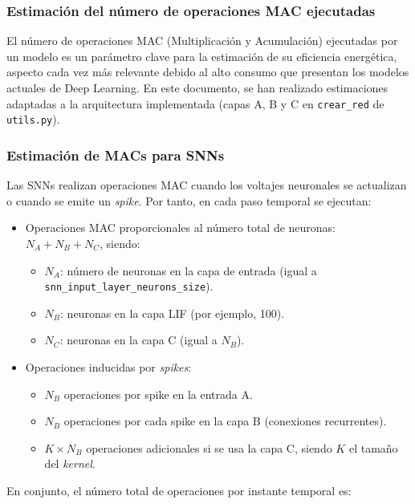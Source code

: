 \subsubsection{Estimación del número de operaciones MAC ejecutadas}

El número de operaciones MAC (Multiplicación y Acumulación) ejecutadas por un modelo es un parámetro clave para la estimación de su eficiencia energética, aspecto cada vez más relevante debido al alto consumo que presentan los modelos actuales de Deep Learning. En este documento, se han realizado estimaciones adaptadas a la arquitectura implementada (capas A, B y C en \texttt{crear\_red} de \texttt{utils.py}).

\subsubsection{Estimación de MACs para SNNs}

Las SNNs realizan operaciones MAC cuando los voltajes neuronales se actualizan o cuando se emite un \textit{spike}. Por tanto, en cada paso temporal se ejecutan:

\begin{itemize}
    \item Operaciones MAC proporcionales al número total de neuronas: $N_A + N_B + N_C$, siendo:
    \begin{itemize}
        \item $N_A$: número de neuronas en la capa de entrada (igual a \texttt{snn\_input\_layer\_neurons\_size}).
        \item $N_B$: neuronas en la capa LIF (por ejemplo, 100).
        \item $N_C$: neuronas en la capa C (igual a $N_B$).
    \end{itemize}
    
    \item Operaciones inducidas por \textit{spikes}:
    \begin{itemize}
        \item $N_B$ operaciones por spike en la entrada A.
        \item $N_B$ operaciones por cada spike en la capa B (conexiones recurrentes).
        \item $K \times N_B$ operaciones adicionales si se usa la capa C, siendo $K$ el tamaño del \textit{kernel}.
    \end{itemize}
\end{itemize}

En conjunto, el número total de operaciones por instante temporal es:

